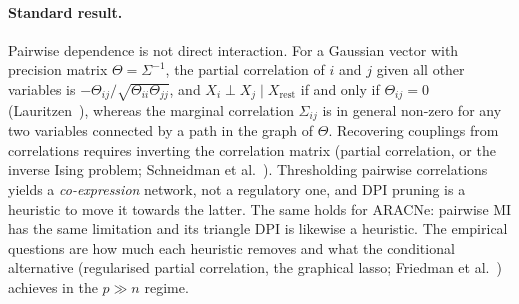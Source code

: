\documentclass[11pt,a4paper]{article}
\theoremstyle{plain}
\theoremstyle{remark}
\begin{document}
\paragraph{Standard result.} Pairwise dependence is not direct interaction. For a Gaussian vector with precision matrix
$\Theta=\Sigma^{-1}$, the partial correlation of $i$ and $j$ given all other variables is $-\Theta_{ij}/\sqrt{\Theta_{ii}\Theta_{jj}}$,
and $X_i\perp X_j\mid X_{\mathrm{rest}}$ if and only if $\Theta_{ij}=0$ (Lauritzen~\cite{lauritzen1996}), whereas the marginal correlation
$\Sigma_{ij}$ is in general non-zero for any two variables connected by a path in the graph of $\Theta$. Recovering couplings
from correlations requires inverting the correlation matrix (partial correlation, or the inverse Ising problem;
Schneidman et al.~\cite{schneidman2006}). Thresholding pairwise correlations yields a \emph{co-expression} network,
not a regulatory one, and DPI pruning is a heuristic to move it towards the latter. The same holds for ARACNe:
pairwise MI has the same limitation and its triangle DPI is likewise a heuristic. The empirical questions are how much each
heuristic removes and what the conditional alternative (regularised partial correlation, the graphical lasso;
Friedman et al.~\cite{friedman2008}) achieves in the $p\gg n$ regime.
\end{document}
